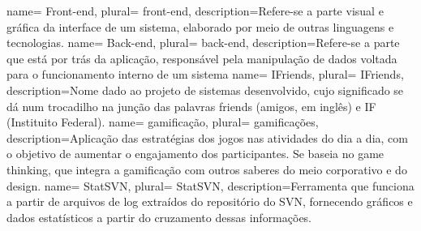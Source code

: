  {
    name= Front-end,
    plural= {front-end},
    description={Refere-se a parte visual e gráfica da interface de um sistema, elaborado por meio de outras linguagens e tecnologias.}
}
 {
    name= Back-end,
    plural= {back-end},
    description={Refere-se a parte que está por trás da aplicação, responsável pela manipulação de dados voltada para o funcionamento interno de um sistema}
}
 {
    name= IFriends,
    plural= {IFriends},
    description={Nome dado ao projeto de sistemas desenvolvido, cujo significado se dá num trocadilho na junção das palavras friends (amigos, em inglês) e IF (Instituito Federal).}
}
 {
    name= gamificação,
    plural= {gamificações},
    description={Aplicação das estratégias dos jogos nas atividades do dia a dia, com o objetivo de aumentar o engajamento dos participantes. Se baseia no game thinking, que integra a gamificação com outros saberes do meio corporativo e do design. }
}
 {
    name= StatSVN,
    plural= {StatSVN},
    description={Ferramenta que funciona a partir de arquivos de log extraídos do
    repositório do SVN, fornecendo gráficos e dados estatísticos a
    partir do cruzamento dessas informações.}
}
